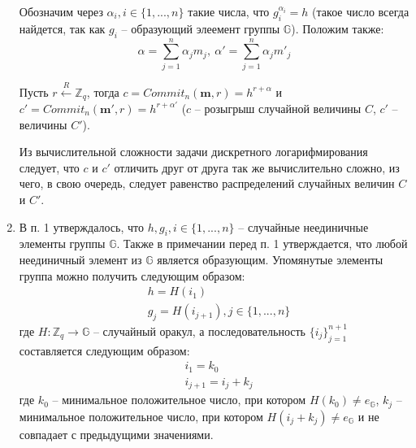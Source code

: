 \documentclass[12pt, a4paper]{extarticle}
\begin{document}
\begin{enumerate}
        Обозначим через $\alpha_i, i \in \{1, ..., n\}$ такие числа, что $g_i^{\alpha_i} = h$ 
        (такое число всегда найдется, так как $g_i$ -- образующий элеемент группы $\mathbb{G}$). 
        Положим также:
        \begin{equation*}
            \alpha = \sum_{j = 1}^{n} \alpha_j m_j,\ \alpha' = \sum_{j = 1}^{n} \alpha_j m'_j
        \end{equation*}
        
        Пусть $r \xleftarrow{R} \mathbb{Z}_q$, тогда $c = Commit_n(\mathbf{m}, r) = h^{r + \alpha}$ 
        и $c' = Commit_n(\mathbf{m'}, r) = h^{r + \alpha'}$ ($c$ -- розыгрыш случайной величины $C$, 
        $c'$ -- величины $C'$).
        
        Из вычислительной сложности задачи дискретного логарифмирования следует, что $c$ и $c'$ 
        отличить друг от друга так же вычислительно сложно, из чего, в свою очередь, следует 
        равенство распределений случайных величин $C$ и $C'$.
        
    \item В п. 1 утверждалось, что $h, g_i, i \in \{1, ...,n\}$ -- случайные неединичные элементы 
        группы $\mathbb{G}$. Также в примечании перед п. 1 утверждается, что любой неединичный 
    	элемент из $\mathbb{G}$ является образующим. Упомянутые элементы группа можно получить 
    	следующим образом:
        \begin{equation}
            \begin{split}
                & h = H(i_1) \\
                & g_j = H(i_{j + 1}), j \in \{1, ..., n\}
            \end{split}
            \label{9.3-elems-generation}
        \end{equation}
        где $H:\mathbb{Z}_q \to \mathbb{G}$ -- случайный оракул, а последовательность 
        $\{i_j\}_{j=1}^{n+1}$ составляется следующим образом:
        \begin{equation*}
            \begin{split}
                & i_1 = k_0 \\
                & i_{j+1} = i_j + k_j
            \end{split}
        \end{equation*}
        где $k_0$ -- минимальное положительное число, при котором $H(k_0) \ne e_{\mathbb{G}}$, 
        $k_j$ -- минимальное положительное число, при котором $H(i_j + k_j) \ne e_{\mathbb{G}}$ и не 
        совпадает с предыдущими значениями.
        

\end{enumerate}
\end{document}
